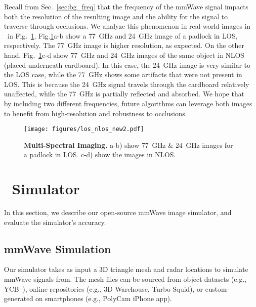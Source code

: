 Recall from Sec.~\ref{sec:bg_freq} that the frequency of the mmWave signal impacts both the resolution of the resulting image and the ability for the signal to traverse through occlusions. 
We analyze this phenomenon in real-world images in \name\ in Fig.~\ref{fig:multispectral}. Fig.\ref{fig:multispectral}a-b show a 77~GHz and 24~GHz image of a padlock in LOS, respectively. The 77~GHz image is higher resolution, as expected. On the other hand, Fig.~\ref{fig:multispectral}c-d show 77~GHz and 24~GHz images of the same object in NLOS (placed underneath cardboard). In this case, the 24~GHz image is very similar to the LOS case, while the 77~GHz shows some artifacts that were not present in LOS. This is because the 24~GHz signal travels through the cardboard relatively unaffected, while the 77~GHz is partially reflected and absorbed. We hope that by including two different frequencies, future algorithms can leverage both images to benefit from high-resolution and robustness to occlusions.

\begin{figure}
\centering
    \texttt{[image: figures/los\_nlos\_new2.pdf]}
    \vspace{-0.07in}
    \caption{\footnotesize{\textbf{Multi-Spectral Imaging.}} \textnormal{a-b) show 77~GHz \& 24~GHz images for a padlock in LOS. c-d) show the images in NLOS. } }
    \label{fig:multispectral}
    \vspace{-0.25in}
\end{figure}



\vspace{-0.12pt}
\section{\name\ Simulator}\label{sec:simulation}
\vspace{-0.1pt}


In this section, we describe our open-source 
mmWave image simulator, and evaluate the simulator's accuracy. 

\vspace{-0.1pt}
\subsection{mmWave Simulation}
\vspace{-0.12pt}

Our simulator takes as input a 3D triangle mesh and radar locations to simulate mmWave signals from. The mesh files can be sourced from object datasets (e.g., YCB~\cite{ycb}), online repositories (e.g., 3D Warehouse, Turbo Squid), or custom-generated on smartphones (e.g., PolyCam iPhone app).

